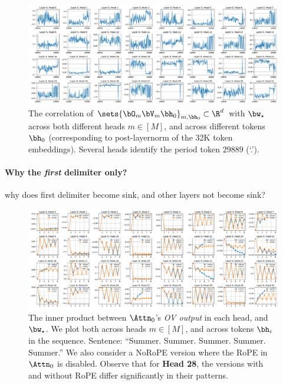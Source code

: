 \begin{figure}[H]
    \centering
    \includegraphics[width=\textwidth]{Figures/attn_0/attn_0_corr_wstar.pdf}
    \caption{\small The correlation of $\sets{\bO_m\bV_m\bh_0}_{m,\bh_0}\subset \R^d$ with $\bw_\star$ across both different heads $m\in[M]$, and across different tokens $\bh_0$ (corresponding to post-layernorm of the 32K token embeddings). Several heads identify the period token $29889$ (`.'). }
\end{figure}



\paragraph{Why the \emph{first} delimiter only?}
why does first delimiter become sink, and other layers not become sink?~

\begin{figure}[H]
    \centering
    \includegraphics[width=\textwidth]{Figures/attn_0/attn_0_inner_prod_wstar.pdf}
    \caption{\small The inner product between $\Attn_0$'s \emph{OV output} in each head, and $\bw_\star$. We plot both across heads $m\in[M]$, and across tokens $\bh_i$ in the sequence. Sentence: ``Summer. Summer. Summer. Summer. Summer.'' We also consider a NoRoPE version where the RoPE in $\Attn_0$ is disabled. Observe that for {\bf Head 28}, the versions with and without RoPE differ significantly in their patterns.}
    \label{fig:attn0-heads-rope}
\end{figure}

